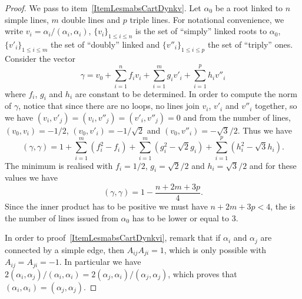 \begin{proof}
    We pass to item~\ref{ItemLesmabsCartDynkv}. Let \( \alpha_0\) be a root linked to \( n\) simple lines, \( m\) double lines and \( p\) triple lines. For notational convenience, we write \( v_i=\alpha_i/(\alpha_i,\alpha_i)\), \( \{ v_i \}_{1\leq i\leq n}\) is the set of ``simply'' linked roots to \( \alpha_0\), \( \{ v'_i \}_{1\leq i\leq m}\) the set of ``doubly'' linked and \( \{ v''_i \}_{1\leq i\leq p}\) the set of ``triply'' ones. Consider the vector
    \begin{equation}
        \gamma=v_0+\sum_{i=1}^nf_iv_i+\sum_{i=1}^mg_iv'_i+\sum_{i=1}^ph_iv''_i
    \end{equation}
    where \( f_i\), \( g_i\) and \( h_i\) are constant to be determined. In order to compute the norm of \( \gamma\), notice that since there are no loops, no lines join \( v_i\), \( v'_i\) and \( v''_i\) together, so we have \( (v_i,v'_j)=(v_i,v''_j)=(v'_i,v''_j)=0\) and from the number of lines, \( (v_0,v_i)=-1/2\), \( (v_0,v'_i)=-1/\sqrt{2}\) and \( (v_0,v''_i)=-\sqrt{3}/2\). Thus we have
    \begin{equation}
        (\gamma,\gamma)=1+\sum_{i=1}^m(f_i^2-f_i)+\sum_{i=1}^m(g_i^2-\sqrt{2}g_i)+\sum_{i=1}^p(h_i^2-\sqrt{3}h_i).
    \end{equation}
    The minimum is realised with \( f_i=1/2\), \( g_i=\sqrt{2}/2\) and \( h_i=\sqrt{3}/2\) and for these values we have
    \begin{equation}
        (\gamma,\gamma)=1-\frac{ n+2m+3p }{ 4 }.
    \end{equation}
    Since the inner product has to be positive we must have \( n+2m+3p<4\), the is the number of lines issued from \( \alpha_0\) has to be lower or equal to \( 3\).

    In order to proof~\ref{ItemLesmabsCartDynkvi}, remark that if \( \alpha_i\) and \( \alpha_j\) are connected by a simple edge, then \( A_{ij}A_{ji}=1\), which is only possible with \( A_{ij}=A_{ji}=-1\). In particular we have \( 2(\alpha_i,\alpha_j)/(\alpha_i,\alpha_i)=2(\alpha_j,\alpha_i)/(\alpha_j,\alpha_j)\), which proves that \( (\alpha_i,\alpha_i)=(\alpha_j,\alpha_j)\).


\end{proof}
